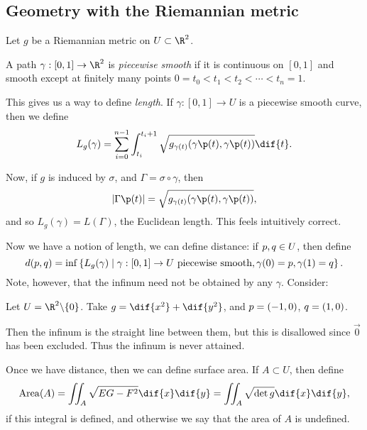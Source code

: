 
	\pagebreak

\subsection{Geometry with the Riemannian metric} %
\label{sub:geometry_with_the_riemannian_metric}

Let $g$ be a Riemannian metric on $U\subset\R^2$.

\begin{definition}
	A path $\gamma:[0,1]\to\R^2$ is \emph{piecewise smooth} if it is continuous on $[0,1]$ and smooth except at finitely many points $0=t_0<t_1<t_2<\cdots<t_n=1$.

	This gives us a way to define \emph{length}. If $\gamma:[0,1]\to U$ is a piecewise smooth curve, then we define
	\begin{equation*}
		L_g(\gamma) = \sum_{i=0}^{n-1} \int_{t_i}^{t_i+1} \sqrt{g_{\gamma(t)} (\gamma\p(t), \gamma\p(t))} \dif{t}.
	\end{equation*}
\end{definition}

Now, if $g$ is induced by $\sigma$, and $\Gamma=\sigma\circ\gamma$, then
\begin{equation*}
	|\Gamma\p(t)| = \sqrt{g_{\gamma(t)} (\gamma\p(t),\gamma\p(t))},
\end{equation*}
and so $L_g(\gamma)=L(\Gamma)$, the Euclidean length. This feels intuitively correct.

Now we have a notion of length, we can define distance: if $p,q\in U$, then define
\begin{equation*}
	d(p,q) = \inf\left\{L_g(\gamma) \mid \gamma:[0,1] \to U \text{ piecewise smooth}, \gamma(0) = p, \gamma(1) = q\right\}.
\end{equation*}
Note, however, that the infinum need not be obtained by any $\gamma$. Consider:

\begin{example}
	Let $U=\R^2\backslash\{\vec{0}\}$. Take $g=\dif{x^2} + \dif{y^2}$, and $p=(-1,0)$, $q=(1,0)$.

	Then the infinum is the straight line between them, but this is disallowed since $\vec{0}$ has been excluded. Thus the infinum is never attained.
\end{example}

Once we have distance, then we can define surface area. If $A\subset U$, then define
\begin{equation*}
	\Area(A) = \iint_A \sqrt{EG-F^2} \dif{x} \dif{y} = \iint_A \sqrt{\det g} \dif{x} \dif{y},
\end{equation*}
if this integral is defined, and otherwise we say that the area of $A$ is undefined.

